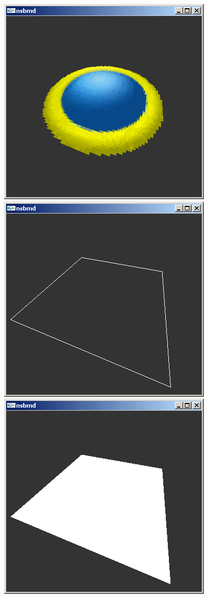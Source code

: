 \documentclass[
]{book}
\begin{document}
\includegraphics{images/58_home_fast6191_romhackingguide_unrenamed_file___s_romhackingguidegraphics3dtextureclear2d_1.png}\includegraphics{images/59_home_fast6191_romhackingguide_unrenamed_file___s_romhackingguidegraphics3dtextureclear2d_2.png}\includegraphics{images/60_home_fast6191_romhackingguide_unrenamed_file___s_romhackingguidegraphics3dtextureclear2d_3.png}
\end{document}

